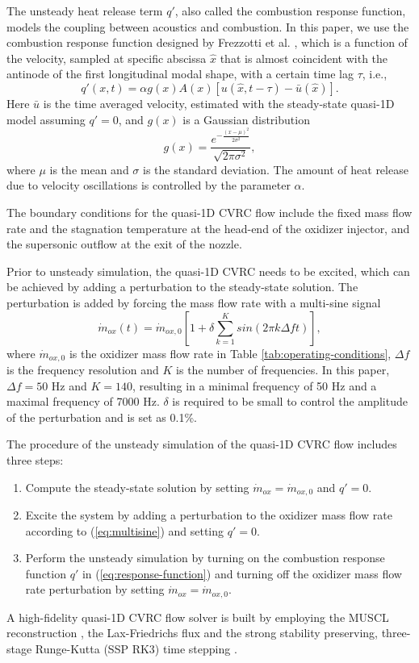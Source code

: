 The unsteady heat release term $q'$, also called the combustion response function, models the coupling between acoustics and combustion. In this paper, we use the combustion response function designed by Frezzotti et al. \cite{frezzotti2017numerical,frezzotti2018quasi}, which is a function of the velocity, sampled at specific abscissa $\hat{x}$ that is almost coincident with the antinode of the first longitudinal modal shape, with a certain time lag $\tau$, i.e.,
\begin{equation}\label{eq:response-function}
q'\left( x,t\right) = \alpha g\left(x\right)  A\left(x\right) \left[ u\left( \hat{x},t-\tau \right) - \bar{u}\left( \hat{x} \right) \right].
\end{equation}
Here $\bar{u}$ is the time averaged velocity, estimated with the steady-state quasi-1D model assuming $q'=0$, and $g(x)$ is a Gaussian distribution  
\begin{equation*}\label{eq:gx}
g\left(x\right)= \frac{e^{-\frac{\left(x-\mu\right)^2}{2\sigma^2}}}{\sqrt{2\pi\sigma^2}},
\end{equation*}
where $\mu$ is the mean and $\sigma$ is the standard deviation. The amount of heat release due to velocity oscillations is controlled by the parameter $\alpha$.

The boundary conditions for the quasi-1D CVRC flow include the fixed mass flow rate and the stagnation temperature at the head-end of the oxidizer injector, and the supersonic outflow at the exit of the nozzle.

Prior to unsteady simulation, the quasi-1D CVRC needs to be excited, which can be achieved by adding a perturbation to the steady-state solution. The perturbation is added by forcing the mass flow rate with a multi-sine signal
\begin{equation}\label{eq:multisine}
\dot{m}_{ox} \left(t\right)= \dot{m}_{ox,0} \left[1 + \delta\sum_{k=1}^{K}  sin\left(2\pi k\Delta f t\right) \right],
\end{equation}
where $\dot{m}_{ox,0}$ is the oxidizer mass flow rate in Table \ref{tab:operating-conditions}, $\Delta f$ is the frequency resolution and $K$ is the number of frequencies. In this paper, $\Delta f = 50 $ Hz and $K=140$, resulting in a minimal frequency of 50 Hz and a maximal frequency of 7000 Hz. $\delta$ is required to be small to control the amplitude of the perturbation and is set as 0.1\%.

The procedure of the unsteady simulation of the quasi-1D CVRC flow includes three steps:
\begin{enumerate}[(1)]
	\item  Compute the steady-state solution by setting $\dot{m}_{ox}=\dot{m}_{ox,0} $ and $q'=0$.
	\item  Excite the system by adding a perturbation to the oxidizer mass flow rate according to (\ref{eq:multisine}) and setting $q'=0$.
	\item  Perform the unsteady simulation by turning on the combustion response function $q'$ in (\ref{eq:response-function}) and turning off the oxidizer mass flow rate perturbation by setting $\dot{m}_{ox}=\dot{m}_{ox,0} $.	
\end{enumerate}


A high-fidelity quasi-1D CVRC flow solver is built by employing the MUSCL reconstruction \cite{delis1998tvd}, the Lax-Friedrichs flux \cite{shu1988efficient} and the strong stability preserving, three-stage Runge-Kutta (SSP RK3) time stepping \cite{jiang1996efficient}.
